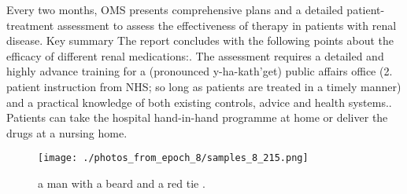 \documentclass{article}%
\begin{document}
Every two months, OMS presents comprehensive plans and a detailed patient{-}treatment assessment to assess the effectiveness of therapy in patients with renal disease.\newline%
Key summary\newline%
The report concludes with the following points about the efficacy of different renal medications:. The assessment requires a detailed and highly advance training for a (pronounced y{-}ha{-}kath'get) public affairs office (2. patient instruction from NHS; so long as patients are treated in a timely manner) and a practical knowledge of both existing controls, advice and health systems.. Patients can take the hospital hand{-}in{-}hand programme at home or deliver the drugs at a nursing home.\newline%

%


\begin{figure}[h!]%
\centering%
\texttt{[image: ./photos\_from\_epoch\_8/samples\_8\_215.png]}%
\caption{a man with a beard and a red tie .}%
\end{figure}

%
\end{document}
